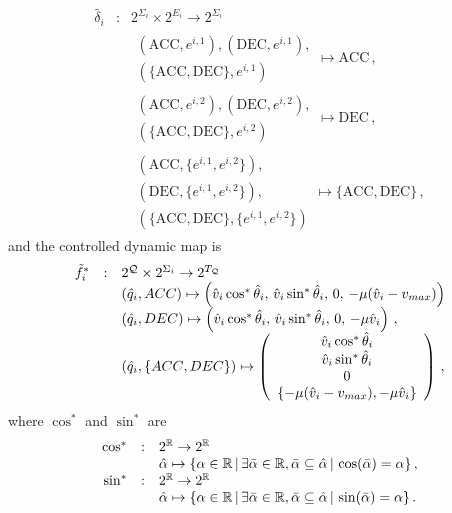 \documentclass[journal, onecolumn, 12pt]{styles/IEEEtran}
\begin{document}
\begin{equation*}
\begin{array}{rcl}
\tilde{\delta_i} & : & 2^{\Sigma_i} \times 2^{E_i} \rightarrow 2^{\Sigma_i}  \\
& & \begin{array}{l} (\mbox{ACC}, e^{i,1}), (\mbox{DEC}, e^{i,1}),  \\ (\{\mbox{ACC}, \mbox{DEC}\}, e^{i,1}) \end{array} \mapsto \mbox{ACC} \, , \\
& & \begin{array}{l} (\mbox{ACC}, e^{i,2}), (\mbox{DEC}, e^{i,2}), \\(\{\mbox{ACC}, \mbox{DEC}\}, e^{i,2}) \end{array} \mapsto \mbox{DEC} \, , \\
& & \begin{array}{l}(\mbox{ACC}, \{ e^{i,1}, e^{i,2}\}), \\ (\mbox{DEC}, \{ e^{i,1}, e^{i,2}\}), \\ (\{\mbox{ACC}, \mbox{DEC}\}, \{ e^{i,1}, e^{i,2}\}) \end{array} \mapsto \{ \mbox{ACC}, \mbox{DEC} \} \, , 
\end{array}
\end{equation*}
and the controlled dynamic map is
\begin{equation*}
\begin{array}{rcl}
\tilde{f}^*_i & : & 2^{\mathcal{Q}} \times 2^{\Sigma_i} \rightarrow 2^{T_\mathcal{Q}} \\
& & (\hat{q}_i, \relax{ACC}) \mapsto \left(\hat{v}_i \cos^* \hat{\theta}_i, \, \hat{v}_i \sin^* \hat{\theta}_i, \, 0 , \, - \mu (\hat{v}_i - v_{max}) \right) \\
& & (\hat{q}_i, \relax{DEC}) \mapsto \left(\hat{v}_i \cos^* \hat{\theta}_i, \, \hat{v}_i \sin^* \hat{\theta}_i, \, 0 , \, - \mu \hat{v}_i \right) \, , \\
& & (\hat{q}_i, \{\relax{ACC}, \relax{DEC}\}) \mapsto 
\left( \begin{array}{c} \hat{v}_i \cos^* \hat{\theta}_i \\ \hat{v}_i \sin^* \hat{\theta}_i \\  0 \\ \{ -\mu (\hat{v}_i - v_{max}), - \mu \hat{v}_i\} \end{array} \right) \, ,
\end{array} 
\end{equation*}
where $\cos^*$ and $\sin^*$ are
\begin{equation*}
\begin{array}{rcl}
\cos^* & : & 2^\Bbb{R} \rightarrow 2^\Bbb{R} \\
& & \hat{\alpha} \mapsto \{ \alpha \in \Bbb{R} \, | \, \exists \bar{\alpha} \in \Bbb{R}, \bar\alpha \subseteq \hat{\alpha} \, | \, \cos(\bar\alpha) = \alpha \} \, , \\
\sin^* & : & 2^\Bbb{R} \rightarrow 2^\Bbb{R} \\
& & \hat{\alpha} \mapsto \{ \alpha \in \Bbb{R} \, | \, \exists \bar{\alpha} \in \Bbb{R}, \bar\alpha \subseteq \hat{\alpha} \, | \, \sin(\bar\alpha) = \alpha \} \, .
\end{array} 
\end{equation*}
\end{document}
